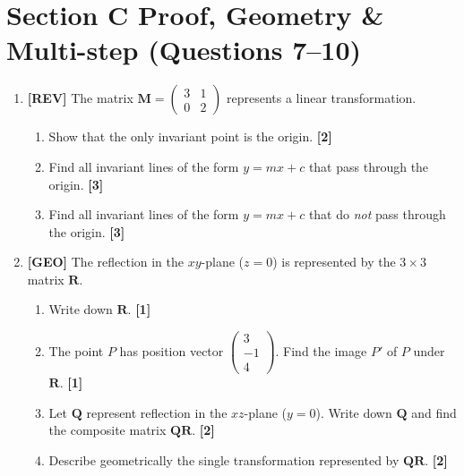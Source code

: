 \documentclass[11pt,a4paper]{article}
\begin{document}
\newpage
\section*{Section C \quad Proof, Geometry \& Multi-step \hfill{\normalfont\small(Questions 7--10)}}
\begin{enumerate}[resume]
\item \textbf{[REV]} The matrix $\mathbf{M} = \begin{pmatrix} 3 & 1 \\ 0 & 2 \end{pmatrix}$ represents a linear transformation.
\begin{enumerate}
  \item Show that the only invariant point is the origin. \hfill{\small\textbf{[2]}}
  \item Find all invariant lines of the form $y = mx + c$ that pass through the origin. \hfill{\small\textbf{[3]}}
  \item Find all invariant lines of the form $y = mx + c$ that do \emph{not} pass through the origin. \hfill{\small\textbf{[3]}}
\end{enumerate}

\item \textbf{[GEO]} The reflection in the $xy$-plane ($z = 0$) is represented by the $3 \times 3$ matrix $\mathbf{R}$.
\begin{enumerate}
  \item Write down $\mathbf{R}$. \hfill{\small\textbf{[1]}}
  \item The point $P$ has position vector $\begin{pmatrix} 3 \\ -1 \\ 4 \end{pmatrix}$. Find the image $P'$ of $P$ under $\mathbf{R}$. \hfill{\small\textbf{[1]}}
  \item Let $\mathbf{Q}$ represent reflection in the $xz$-plane ($y = 0$). Write down $\mathbf{Q}$ and find the composite matrix $\mathbf{Q}\mathbf{R}$. \hfill{\small\textbf{[2]}}
  \item Describe geometrically the single transformation represented by $\mathbf{Q}\mathbf{R}$. \hfill{\small\textbf{[2]}}
\end{enumerate}

\begin{center}
\end{center}
\end{enumerate}
\end{document}
